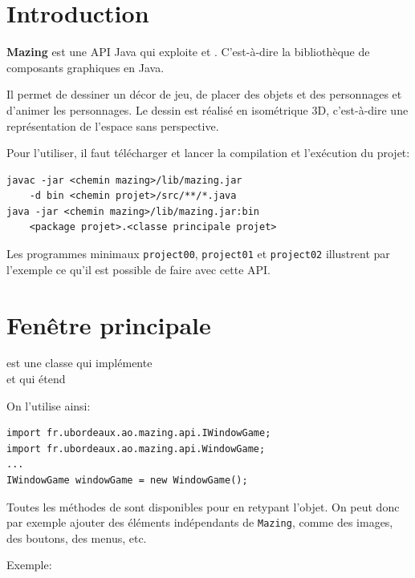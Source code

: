 \documentclass[11pt]{article}
\begin{document}

\section*{Introduction}

\textbf{Mazing} est une API Java qui exploite  et . C'est-à-dire 
la bibliothèque de composants graphiques en Java.

Il permet de dessiner un décor de jeu, de placer des objets et des personnages et d'animer les personnages.
Le dessin est réalisé en isométrique 3D, c'est-à-dire une représentation de l'espace sans perspective.

Pour l'utiliser, il faut télécharger  et lancer la compilation et l'exécution du projet:

\begin{lstlisting}[]
javac -jar <chemin mazing>/lib/mazing.jar 
    -d bin <chemin projet>/src/**/*.java
java -jar <chemin mazing>/lib/mazing.jar:bin 
    <package projet>.<classe principale projet>
\end{lstlisting}

Les programmes minimaux \texttt{project00}, \texttt{project01} et \texttt{project02} illustrent par 
l'exemple ce qu'il est possible de faire avec cette API.

\section*{Fenêtre principale}

 est une classe qui implémente\\ 
 et qui étend 

On l'utilise ainsi:
\begin{lstlisting}[]
import fr.ubordeaux.ao.mazing.api.IWindowGame;
import fr.ubordeaux.ao.mazing.api.WindowGame;
...
IWindowGame windowGame = new WindowGame();
\end{lstlisting}

Toutes les méthodes de  sont disponibles pour  en retypant l'objet. On peut donc par exemple 
ajouter des éléments indépendants de \texttt{Mazing}, comme des images, des boutons, des menus, etc.

Exemple:
\end{document}
